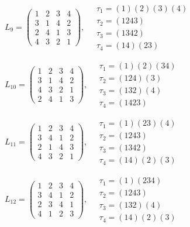 $L_{9} = \begin{pmatrix} 1 & 2 & 3 & 4 \\ 3 & 1 & 4 & 2 \\ 2 & 4 & 1 & 3 \\ 4 & 3 & 2 & 1 \end{pmatrix}, \quad \begin{matrix} \tau_{1} = (1)(2)(3)(4) \\ \tau_{2} = (1 2 4 3) \\ \tau_{3} = (1 3 4 2) \\ \tau_{4} = (1 4)(2 3) \end{matrix}$

$L_{10} = \begin{pmatrix} 1 & 2 & 3 & 4 \\ 3 & 1 & 4 & 2 \\ 4 & 3 & 2 & 1 \\ 2 & 4 & 1 & 3 \end{pmatrix}, \quad \begin{matrix} \tau_{1} = (1)(2)(3 4) \\ \tau_{2} = (1 2 4)(3) \\ \tau_{3} = (1 3 2)(4) \\ \tau_{4} = (1 4 2 3) \end{matrix}$

$L_{11} = \begin{pmatrix} 1 & 2 & 3 & 4 \\ 3 & 4 & 1 & 2 \\ 2 & 1 & 4 & 3 \\ 4 & 3 & 2 & 1 \end{pmatrix}, \quad \begin{matrix} \tau_{1} = (1)(2 3)(4) \\ \tau_{2} = (1 2 4 3) \\ \tau_{3} = (1 3 4 2) \\ \tau_{4} = (1 4)(2)(3) \end{matrix}$

$L_{12} = \begin{pmatrix} 1 & 2 & 3 & 4 \\ 3 & 4 & 1 & 2 \\ 2 & 3 & 4 & 1 \\ 4 & 1 & 2 & 3 \end{pmatrix}, \quad \begin{matrix} \tau_{1} = (1)(2 3 4) \\ \tau_{2} = (1 2 4 3) \\ \tau_{3} = (1 3 2)(4) \\ \tau_{4} = (1 4)(2)(3) \end{matrix}$


